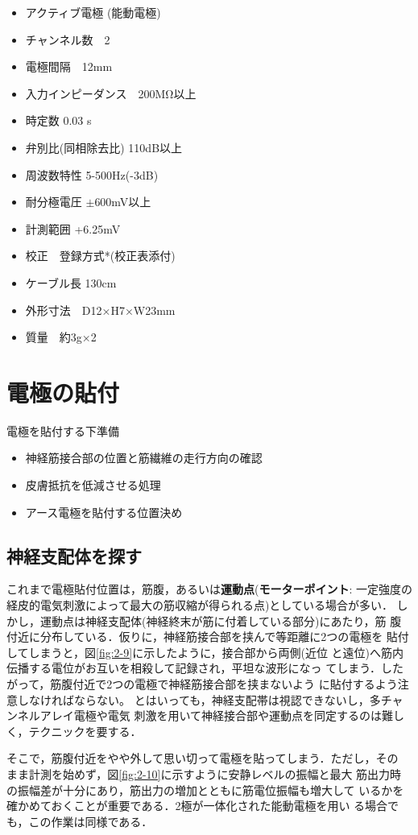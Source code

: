 \documentclass[10pt,twocolumn]{jarticle}
\begin{document}
\begin{itemize}
\item アクティブ電極 (能動電極)
\item チャンネル数　2
\item 電極間隔　12mm
\item 入力インピーダンス　200MΩ以上
\item 時定数 0.03 s
\item 弁別比(同相除去比) 110dB以上
\item 周波数特性 5-500Hz(-3dB)
\item 耐分極電圧 $\pm$600mV以上
\item 計測範囲 +6.25mV
\item 校正　登録方式*(校正表添付)
\item ケーブル長 130cm
\item 外形寸法　D12×H7×W23mm
\item 質量　約3g×2
\end{itemize}


\section{電極の貼付}
電極を貼付する下準備
\begin{itemize}
\item 神経筋接合部の位置と筋繊維の走行方向の確認
\item 皮膚抵抗を低減させる処理
\item アース電極を貼付する位置決め
\end{itemize}
\subsection{神経支配体を探す}
これまで電極貼付位置は，筋腹，あるいは{\bf 運動点}({\bf モーターポイント}:
一定強度の経皮的電気刺激によって最大の筋収縮が得られる点)としている場合が多い．
しかし，運動点は神経支配体(神経終末が筋に付着している部分)にあたり，筋
腹付近に分布している．仮りに，神経筋接合部を挟んで等距離に2つの電極を
貼付してしまうと，図\ref{fig:2-9}に示したように，接合部から両側(近位
と遠位)へ筋内伝播する電位がお互いを相殺して記録され，平坦な波形になっ
てしまう．したがって，筋腹付近で2つの電極で神経筋接合部を挟まないよう
に貼付するよう注意しなければならない。
とはいっても，神経支配帯は視認できないし，多チャンネルアレイ電極や電気
刺激を用いて神経接合部や運動点を同定するのは難しく，テクニックを要する．

そこで，筋腹付近をやや外して思い切って電極を貼ってしまう．ただし，その
まま計測を始めず，図\ref{fig:2-10}に示すように安静レベルの振幅と最大
筋出力時の振幅差が十分にあり，筋出力の増加とともに筋電位振幅も増大して
いるかを確かめておくことが重要である．2極が一体化された能動電極を用い
る場合でも，この作業は同様である．
\end{document}
